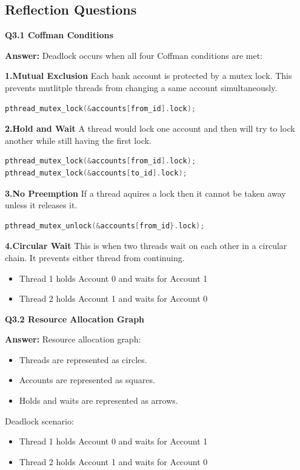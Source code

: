 \documentclass[12pt]{article}
\begin{document}
\subsection{Reflection Questions}

\textbf{Q3.1 Coffman Conditions}

\textbf{Answer:}
Deadlock occurs when all four Coffman conditions are met:

\textbf{1.Mutual Exclusion}
Each bank account is protected by a mutex lock. This prevents mutlitple threads from changing a same account simultaneously.
\begin{lstlisting}[language=C]
pthread_mutex_lock(&accounts[from_id].lock);
\end{lstlisting}

\textbf{2.Hold and Wait}
A thread would lock one account and then will try to lock another while still having the first lock.
\begin{lstlisting}[language=C]
pthread_mutex_lock(&accounts[from_id].lock);
pthread_mutex_lock(&accounts[to_id].lock);
\end{lstlisting}

\textbf{3.No Preemption}
If a thread aquires a lock then it cannot be taken away unless it releases it.
\begin{lstlisting}[language=C]
pthread_mutex_unlock(&accounts[from_id}.lock);
\end{lstlisting}

\textbf{4.Circular Wait}
This is when two threads wait on each other in a circular chain. It prevents either thread from continuing.
\begin{itemize}
\item Thread 1 holds Account 0 and waits for Account 1
\item Thread 2 holds Account 1 and waits for Account 0
\end{itemize}

\bigskip

\textbf{Q3.2 Resource Allocation Graph}

\textbf{Answer:}
Resource allocation graph:
\begin{itemize}
\item Threads are represented as circles.
\item Accounts are represented as squares.
\item Holds and waits are represented as arrows.
\end{itemize}

Deadlock scenario:
\begin{itemize}
\item Thread 1 holds Account 0 and waits for Account 1
\item Thread 2 holds Account 1 and waits for Account 0
\end{itemize}
\end{document}

